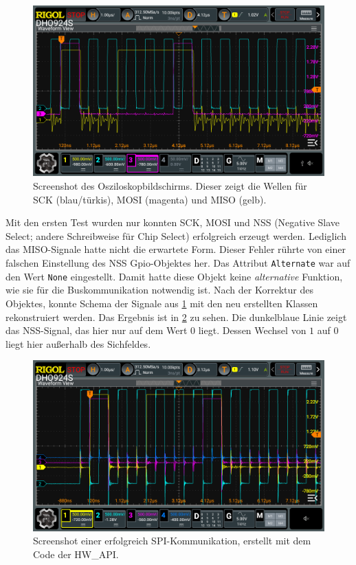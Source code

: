 \begin{figure}[H]
	\includegraphics[width=\textwidth]{Pics/oszi_cube_spi_example.png}
	\caption{Screenshot des Osziloskopbildschirms. Dieser zeigt die Wellen für SCK (blau/türkis), MOSI (magenta) und MISO (gelb).}
	\label{fig:oszi_cube_spi_example}
\end{figure}

Mit den ersten Test wurden nur konnten SCK, MOSI und NSS (Negative Slave Select; andere Schreibweise für Chip Select) erfolgreich erzeugt werden.
Lediglich das MISO-Signale hatte nicht die erwartete Form.
Dieser Fehler rührte von einer falschen Einstellung des NSS Gpio-Objektes her.
Das Attribut \texttt{Alternate} war auf den Wert \texttt{None} eingestellt.
Damit hatte diese Objekt keine \textit{alternative} Funktion, wie sie für die Buskommunikation notwendig ist.
Nach der Korrektur des Objektes, konnte Schema der Signale aus \cref{fig:oszi_cube_spi_example} mit den neu erstellten Klassen rekonstruiert werden.
Das Ergebnis ist in \cref{fig:oszi_spi_signal_test} zu sehen.
Die dunkelblaue Linie zeigt das NSS-Signal, das hier nur auf dem Wert $0$ liegt.
Dessen Wechsel von $1$ auf $0$ liegt hier außerhalb des Sichfeldes.

\begin{figure}[H]
	\includegraphics[width=\textwidth]{Pics/spi_signal_test.png}
	\caption{Screenshot einer erfolgreich SPI-Kommunikation, erstellt mit dem Code der HW\_API.}
	\label{fig:oszi_spi_signal_test}
\end{figure}


